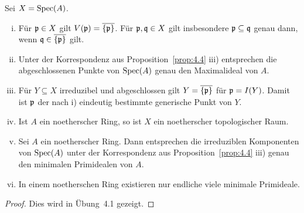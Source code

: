 \begin{prop}
\label{prop:4.7}
	Sei $X = \operatorname{Spec}(A)$.
	\begin{enumerate}[i)]
		\item Für $\mathfrak{p} \in X$ gilt $V(\mathfrak{p}) = \overline{\{\mathfrak{p}\}}$. Für $\mathfrak{p}, \mathfrak{q} \in X$ gilt insbesondere $\mathfrak{p} \subseteq \mathfrak{q}$ genau dann, wenn $\mathfrak{q} \in \overline{\{\mathfrak{p}\}}$ gilt.
		\item Unter der Korrespondenz aus Proposition~\ref{prop:4.4} iii) entsprechen die abgeschlossenen Punkte von $\operatorname{Spec}(A)$ genau den Maximalideal von $A$.
		\item Für $Y \subseteq X$ irreduzibel und abgeschlossen gilt $Y = \overline{\{\mathfrak{p}\}}$ für $\mathfrak{p} = I(Y)$. Damit ist $\mathfrak{p}$ der nach i) eindeutig bestimmte generische Punkt von $Y$.
		\item Ist $A$ ein noetherscher Ring, so ist $X$ ein noetherscher topologischer Raum.
		\item Sei $A$ ein noetherscher Ring. Dann entsprechen die irreduziblen Komponenten von $\operatorname{Spec}(A)$ unter der Korrespondenz aus Proposition~\ref{prop:4.4} iii) genau den minimalen Primidealen von $A$.
		\item In einem noetherschen Ring existieren nur endliche viele minimale Primideale.
	\end{enumerate}
	\begin{proof}
		Dies wird in Übung~4.1 gezeigt.
	\end{proof}
\end{prop}

